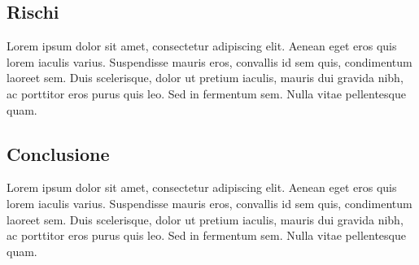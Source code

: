 \documentclass[../studio-di-fattibilita.tex]{subfiles}
\begin{document}
\subsection{Rischi}%
\label{sub:rischi}
Lorem ipsum dolor sit amet, consectetur adipiscing elit. Aenean eget eros quis lorem iaculis varius. Suspendisse mauris eros, convallis id sem quis, condimentum laoreet sem. Duis scelerisque, dolor ut pretium iaculis, mauris dui gravida nibh, ac porttitor eros purus quis leo. Sed in fermentum sem. Nulla vitae pellentesque quam.

\subsection{Conclusione}%
\label{sub:conclusione}
Lorem ipsum dolor sit amet, consectetur adipiscing elit. Aenean eget eros quis lorem iaculis varius. Suspendisse mauris eros, convallis id sem quis, condimentum laoreet sem. Duis scelerisque, dolor ut pretium iaculis, mauris dui gravida nibh, ac porttitor eros purus quis leo. Sed in fermentum sem. Nulla vitae pellentesque quam.
\end{document}
